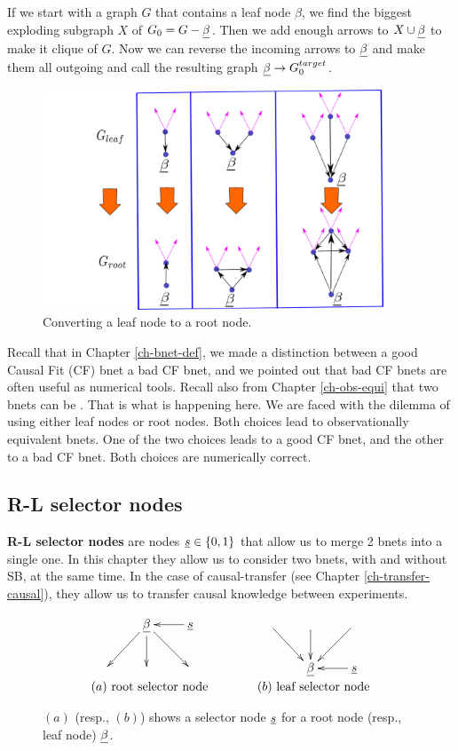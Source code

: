 If we start with a graph $G$ that contains a leaf node $\beta$, 
we find the biggest exploding subgraph $X$ of
$G_0 =G  -\rvbeta$.
Then we add enough
arrows to $X\cup \rvbeta$
to make it clique of $G$.
Now we can reverse the incoming
arrows to $\rvbeta$ and make them
all outgoing and call the
resulting graph $\rvbeta\rarrow G_0^{target}$.




\begin{figure}[h!]
\centering
\includegraphics[width=4in]
{sb-removal/sel-nd-reversal.png}
\caption{Converting 
a leaf node
to a root node.}
\label{fig-sel-nd-reversal}
\end{figure}

Recall that in Chapter \ref{ch-bnet-def},
we made a distinction
between a good Causal Fit (CF) bnet
a bad CF bnet, and
we pointed out
that bad CF bnets are
often useful as
numerical tools.
Recall also from Chapter
\ref{ch-obs-equi}
that two bnets can be
.
That is what is happening here.
We are faced with
the dilemma of
using
either
leaf nodes or root nodes.
Both
choices  lead to observationally
equivalent bnets.
One of the two choices
leads to a good
CF bnet,
and the other to a bad CF bnet.
Both choices are numerically
correct.

\subsection{R-L selector nodes}
{\bf R-L selector nodes} are  nodes
$\rvs\in \bool$ that allow us to merge 2 bnets into a single one. In this chapter they allow us 
to consider two bnets, with and without SB, at the same time.
In the case of causal-transfer (see Chapter \ref{ch-transfer-causal}), they
allow us
 to transfer causal knowledge
between experiments.


\begin{figure}[h!]
$$
\begin{array}{ccc}
\xymatrix{
&\rvbeta\ar[dl]\ar[d]\ar[dr]&\rvs\ar[l]
\\
&&
}
&\quad\quad&
\xymatrix{
\ar[dr]&\ar[d]&\ar[dl]
\\
&\rvbeta&\rvs\ar[l]
}
\\
(a)\text{ root selector node} 
&& (b)\text{ leaf selector node}
\end{array}
$$
\caption{$(a)$ (resp., $(b)$) shows a selector node $\rvs$ for a
root node (resp., leaf node) $\rvbeta$.}
\label{fig-rl-selectors}
\end{figure}

